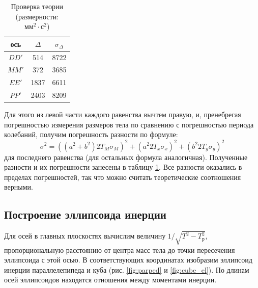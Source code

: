 		\begin{table}
			\centering
			\begin{tabular}{|c|c|c|}
				ось & $\Delta$ & $\sigma_\Delta$ \\
				\hline
				$DD'$ & 514 & 8722 \\
				$MM'$ & 372 & 3685 \\
				$EE'$ & 1837 & 6611 \\
				$PP'$ & 2403 & 8209
			\end{tabular}
			\caption{Проверка теории (размерности: $\text{мм}^2 \cdot \text{с}^2$)}
			\label{table:check}
		\end{table}
 
		Для этого из левой части каждого равенства вычтем правую, и, пренебрегая погрешностью измерения размеров тела по сравнению с погрешностью периода колебаний, получим погрешность разности по формуле:
		\[\sigma^2 = \left(\left(a^2 + b^2\right) 2T_M \sigma_M\right)^2 + \left(a^2 2T_x \sigma_x\right)^2 + \left(b^2 2T_y \sigma_y\right)^2\]
		для последнего равенства (для остальных формула аналогичная). Полученные разности и их погрешности занесены в таблицу \ref{table:check}. Все разности оказались в пределах погрешностей, так что можно считать теоретические соотношения верными.

		\subsection{Построение эллипсоида инерции}
			Для осей в главных плоскостях вычислим величину $1/\sqrt{T^2-T_\text{р}^2}$, пропорциональную расстоянию от центра масс тела до точки пересечения эллипсоида с этой осью. В соответствующих координатах изобразим эллипсоид инерции параллелепипеда и куба (рис. \ref{fig:parped} и \ref{fig:cube_el}). По длинам осей эллипсоидов находятся отношения между моментами инерции.

